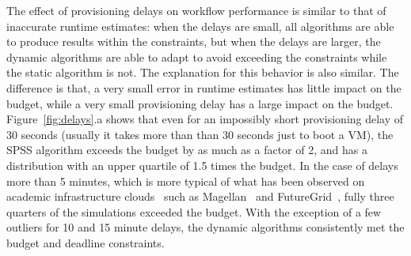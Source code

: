 \documentclass[conference]{IEEEtran}
\begin{document}
The effect of provisioning delays on workflow performance is similar to that of inaccurate runtime estimates: when the delays are small, all algorithms are able to produce results within the constraints, but when the delays are larger, the dynamic algorithms are able to adapt to avoid exceeding the constraints while the static algorithm is not. The explanation for this behavior is also similar. The difference is that, a very small error in runtime estimates has little impact on the budget, while a very small provisioning delay has a large impact on the budget. Figure~\ref{fig:delays}.a shows that even for an impossibly short provisioning delay of 30 seconds (usually it takes more than than 30 seconds just to boot a VM), the SPSS algorithm exceeds the budget by as much as a factor of 2, and has a distribution with an upper quartile of 1.5 times the budget. In the case of delays more than 5 minutes, which is more typical of what has been observed on academic infrastructure clouds~\cite{Juve2011} such as Magellan~\cite{Magellan} and FutureGrid~\cite{FutureGrid}, fully three quarters of the simulations exceeded the budget. With the exception of a few outliers for 10 and 15 minute delays, the dynamic algorithms consistently met the budget and deadline constraints.


\end{document}
